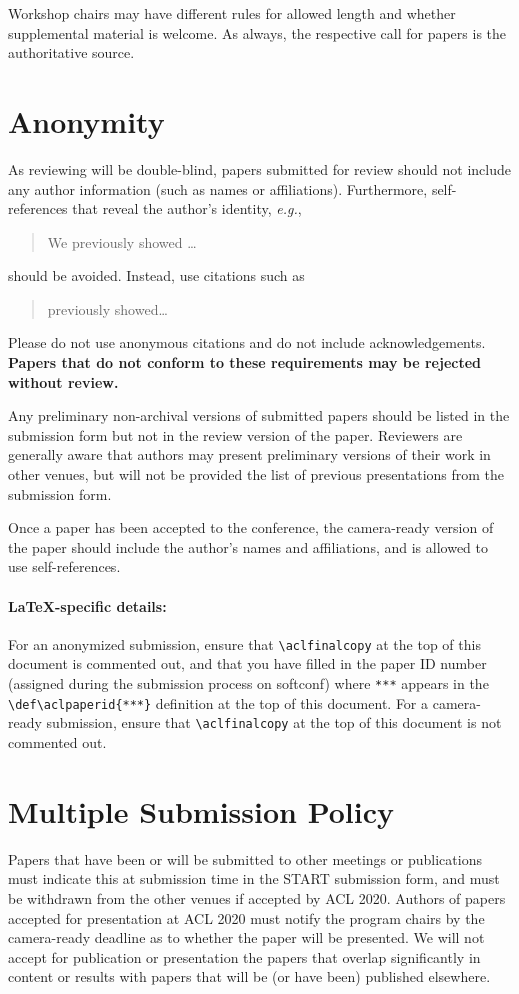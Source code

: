 \documentclass[11pt,a4paper]{article}
\begin{document}
Workshop chairs may have different rules for allowed length and whether supplemental material is welcome.
As always, the respective call for papers is the authoritative source.


\section{Anonymity}
As reviewing will be double-blind, papers submitted for review should not include any author information (such as names or affiliations). Furthermore, self-references that reveal the author's identity, \emph{e.g.},
\begin{quote}
  We previously showed \citep{Gusfield:97} \ldots
\end{quote}
should be avoided. Instead, use citations such as
\begin{quote}
  \citet{Gusfield:97} previously showed\ldots
\end{quote}
Please do not use anonymous citations and do not include acknowledgements.
\textbf{Papers that do not conform to these requirements may be rejected without review.}

Any preliminary non-archival versions of submitted papers should be listed in the submission form but not in the review version of the paper.
Reviewers are generally aware that authors may present preliminary versions of their work in other venues, but will not be provided the list of previous presentations from the submission form.

Once a paper has been accepted to the conference, the camera-ready version of the paper should include the author's names and affiliations, and is allowed to use self-references.

\paragraph{\LaTeX-specific details:}
For an anonymized submission, ensure that {\small\verb|\aclfinalcopy|} at the top of this document is commented out, and that you have filled in the paper ID number (assigned during the submission process on softconf) where {\small\verb|***|} appears in the {\small\verb|\def\aclpaperid{***}|} definition at the top of this document.
For a camera-ready submission, ensure that {\small\verb|\aclfinalcopy|} at the top of this document is not commented out.


\section{Multiple Submission Policy}
Papers that have been or will be submitted to other meetings or publications must indicate this at submission time in the START submission form, and must be withdrawn from the other venues if accepted by ACL 2020. Authors of papers accepted for presentation at ACL 2020 must notify the program chairs by the camera-ready deadline as to whether the paper will be presented. We will not accept for publication or presentation the papers that overlap significantly in content or results with papers that will be (or have been) published elsewhere.
\end{document}
